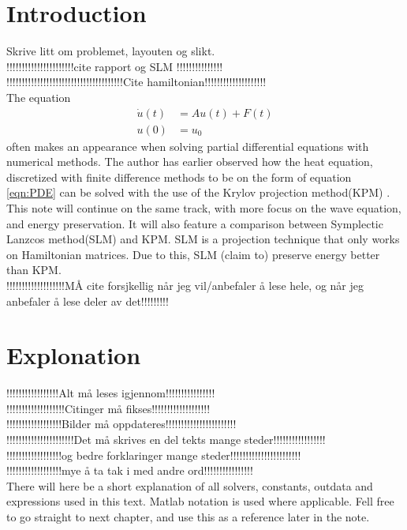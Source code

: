 \chapter{Introduction}
Skrive litt om problemet, layouten og slikt. \\
!!!!!!!!!!!!!!!!!!!!!!cite rapport og SLM !!!!!!!!!!!!!!!\\
!!!!!!!!!!!!!!!!!!!!!!!!!!!!!!!!!!!!!!Cite hamiltonian!!!!!!!!!!!!!!!!!!!!\\
The equation 
\begin{equation} 
\begin{aligned}
\dot{u}(t) &= A u(t) + F(t) \\
u(0)&= u_0
\end{aligned}
\label{eqn:PDE}
\end{equation}
often makes an appearance when solving partial differential equations with numerical methods. The author has earlier observed how the heat equation, discretized with finite difference methods to be on the form of equation \eqref{eqn:PDE} can be solved with the use of the Krylov projection method(KPM) \cite{min}. This note will continue on the same track, with more focus on the wave equation, and energy preservation. It will also feature a comparison between Symplectic Lanzcos method(SLM) \cite{SLM} and KPM. SLM is a projection technique that only works on Hamiltonian matrices. Due to this, SLM (claim to) preserve energy better than KPM.\\

!!!!!!!!!!!!!!!!!!!MÅ cite forsjkellig når jeg vil/anbefaler å lese hele, og når jeg anbefaler å lese deler av det!!!!!!!!!\\

\chapter{Explonation}
!!!!!!!!!!!!!!!!!Alt må leses igjennom!!!!!!!!!!!!!!!!\\
!!!!!!!!!!!!!!!!!!!Citinger må fikses!!!!!!!!!!!!!!!!!!!\\
!!!!!!!!!!!!!!!!!!Bilder må oppdateres!!!!!!!!!!!!!!!!!!!!!!!\\
!!!!!!!!!!!!!!!!!!!!!!Det må skrives en del tekts mange steder!!!!!!!!!!!!!!!!!\\
!!!!!!!!!!!!!!!!!!og bedre forklaringer mange steder!!!!!!!!!!!!!!!!!!!!!!!\\
!!!!!!!!!!!!!!!!!!mye å ta tak i med andre ord!!!!!!!!!!!!!!!!\\
There will here be a short explanation of all solvers, constants, outdata and expressions used in this text. Matlab notation is used where applicable. Fell free to go straight to next chapter, and use this as a reference later in the note.

